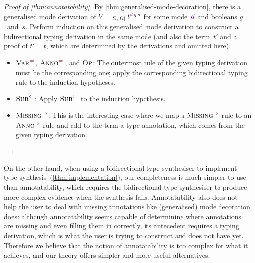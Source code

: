 \begin{proof}[Proof of \cref{thm:annotatability}]
By \cref{thm:generalised-mode-decoration}, there is a generalised mode derivation of $V |-_{\Sigma,\erase\Omega} t^{\dir{d}\,g\,s}$ for some mode~$\dir{d}$ and booleans $g$~and~$s$.
Perform induction on this generalised mode derivation to construct a bidirectional typing derivation in the same mode (and also the term~$t'$ and a proof of $t' \sqsupseteq t$, which are determined by the derivations and omitted here).
\begin{itemize}
\item $\SynRule{Var}$, $\SynRule{Anno}$, and $\textnormal{\textsc{Op}}$:
The outermost rule of the given typing derivation must be the corresponding one; apply the corresponding bidirectional typing rule to the induction hypotheses.
\item $\ChkRule{Sub}$:
Apply $\ChkRule{Sub}$ to the induction hypothesis.
\item $\SynRule{Missing}$:
This is the interesting case where we map a $\SynRule{Missing}$ rule to an $\SynRule{Anno}$ rule and add to the term a type annotation, which comes from the given typing derivation.
\vspace{-\topsep-\baselineskip}
\end{itemize}
\end{proof}

On the other hand, when using a bidirectional type synthesiser to implement type synthesis~(\cref{thm:implementation}), our completeness is much simpler to use than annotatability, which requires the bidirectional type synthesiser to produce more complex evidence when the synthesis fails.
Annotatability also does not help the user to deal with missing annotations like (generalised) mode decoration does: although annotatability seems capable of determining where annotations are missing and even filling them in correctly, its antecedent requires a typing derivation, which is what the user is trying to construct and does not have yet.
Therefore we believe that the notion of annotatability is too complex for what it achieves, and our theory offers simpler and more useful alternatives.
